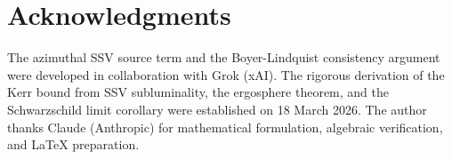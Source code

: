 \documentclass[12pt]{article}
\begin{document}
\section*{Acknowledgments}

The azimuthal SSV source term and the Boyer-Lindquist consistency
argument were developed in collaboration with Grok (xAI).  The
rigorous derivation of the Kerr bound from SSV subluminality, the
ergosphere theorem, and the Schwarzschild limit corollary were
established on 18 March 2026.  The author thanks Claude (Anthropic)
for mathematical formulation, algebraic verification, and LaTeX
preparation.

\end{document}
